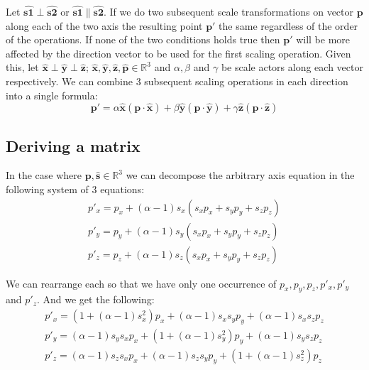 \documentclass[]{report}   %
\begin{document}
Let \(\mathbf{\hat{s1}}\perp\mathbf{\hat{s2}}\) or \(\mathbf{\hat{s1}}\parallel\mathbf{\hat{s2}}\). If we do two subsequent scale transformations on vector \(\mathbf{p}\) along each of the two axis the resulting point \(\mathbf{p\prime}\) the same regardless of the order of the operations. If none of the two conditions holds true then \(\mathbf{p\prime}\) will be more affected by the direction vector to be used for the first scaling operation. Given this, let \(\mathbf{\hat{x}}\perp\mathbf{\hat{y}}\perp\mathbf{\hat{z}}\); \(\mathbf{\hat{x}},\mathbf{\hat{y}},\mathbf{\hat{z}},\mathbf{\hat{p}} \in \mathbb{R}^3\) and \(\alpha,\beta\) and \(\gamma\) be scale actors along each vector respectively. We can combine 3 subsequent scaling operations in each direction into a single formula:
\[
	\mathbf{p\prime} = 
	\alpha \mathbf{\hat{x}}( \mathbf{p} \cdot \mathbf{\hat{x}}) +
	\beta \mathbf{\hat{y}}( \mathbf{p} \cdot \mathbf{\hat{y}}) +
	\gamma \mathbf{\hat{z}}( \mathbf{p} \cdot \mathbf{\hat{z}})
\]


\subsection{Deriving a matrix}

In the case where \(\mathbf{p},\mathbf{\hat{s}} \in \mathbb{R}^3\) we can decompose the arbitrary axis equation in the following system of 3 equations:
\begin{align*}
	p\prime_x = p_x + (\alpha - 1)s_x(s_x p_x +	s_y p_y + s_z p_z)	\\
	p\prime_y = p_y + (\alpha - 1)s_y(s_x p_x +	s_y p_y + s_z p_z)	\\
	p\prime_z = p_z + (\alpha - 1)s_z(s_x p_x +	s_y p_y + s_z p_z)
\end{align*}

We can rearrange each so that we have only one occurrence of \(p_x, p_y, p_z, p\prime_x, p\prime_y\) and \(p\prime_z\). And we get the following:
\begin{align*}
	p\prime_x = (1 + (\alpha - 1)s_x^2)p_x + (\alpha - 1)s_x s_y p_y + (\alpha - 1)s_x s_z p_z	\\
	p\prime_y = (\alpha - 1)s_y s_x p_x + (1 + (\alpha - 1)s_y^2)p_y + (\alpha - 1)s_y s_z p_z	\\
	p\prime_z = (\alpha - 1)s_z s_x p_x + (\alpha - 1)s_z s_y p_y + (1 + (\alpha - 1)s_z^2)p_z
\end{align*}
\end{document}
